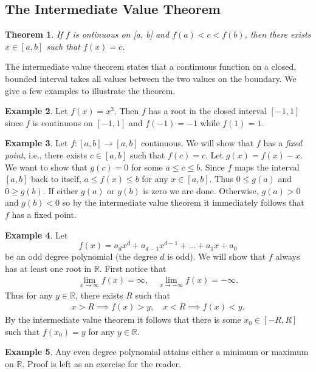 \documentclass[11pt,oneside,reqno]{amsart}
\newcommand\R{{\mathbb R}}
\numberwithin{equation}{section}
\newtheorem{theorem}{Theorem}[section]
\theoremstyle{definition}
\newtheorem{example}[theorem]{Example}
\theoremstyle{remark}
\begin{document}
\subsection{The Intermediate Value Theorem} 
\begin{theorem}
    If $f$ is ontinuous on [a, b] and $f(a) < c < f(b)$, then there exists $x \in [a,b]$ such that $f(x) = c$. 
\end{theorem}
The intermediate value theorem states that a continuous function on a closed, bounded interval takes all values between the two values on the boundary. We
give a few examples to illustrate the theorem. 
\begin{example}
    Let $f(x) = x^3$. Then $f$ has a root in the closed interval $[-1, 1]$ since $f$ is continuous on $[-1,1]$ and $f(-1)=-1$ while $f(1)=1$. 
\end{example}
\begin{example}\label{example:fixedpoint}
    Let $f: [a, b] \to [a, b]$ continuous. We will show that $f$ has a \textit{fixed point}, i.e., there exists $c \in [a,b]$ such that $f(c) = c$. Let $g(x) = f(x)-x$.
    We want to show that $g(c) = 0$ for some $a \leq c \leq b$. Since $f$ maps the interval $[a,b]$ back to itself, $a \leq f(x) \leq b$ for any $x \in [a,b]$. Thus $0 \leq g(a)$ and $0 \geq g(b)$. If either $g(a)$ or $g(b)$ is zero
    we are done. Otherwise, $g(a) > 0$ and $g(b) < 0$ so by the intermediate value theorem it immediately follows that $f$ has a fixed point. 
\end{example}
\begin{example}\label{example:oddpoly}
    Let 
    \[f(x) = a_dx^d + a_{d-1}x^{d-1} + \dots + a_1x + a_0\]
    be an odd degree polynomial (the degree $d$ is odd). We will show that $f$ always has at least one root in $\R$. First notice that 
    \begin{align*}
        \lim_{x\to\infty}f(x) = \infty, \quad \lim_{x\to-\infty}f(x) = -\infty.
    \end{align*}
    Thus for any $y\in\R$, there exists $R$ such that 
    \begin{align*}
        x > R \implies f(x) > y, \quad x < R \implies f(x) < y. 
    \end{align*}
    By the intermediate value theorem it follows that there is some $x_0 \in [-R, R]$ such that $f(x_0) = y$ for any $y\in\R$.
\end{example}
\begin{example}
    Any even degree polynomial attains either a minimum or maximum on $\R$. Proof is left as an exercise for the reader. 
\end{example}
\end{document}
